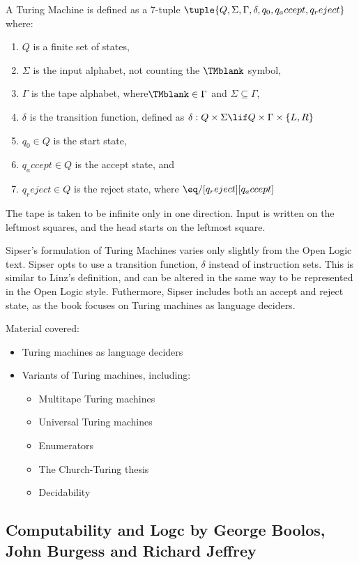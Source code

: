 \documentclass[../../include/open-logic-section]{subfiles}
\begin{document}
A Turing Machine is defined as a 7-tuple $\tuple{Q, \Sigma, \Gamma, \delta, q_0, q_accept, q_reject}$ where:
\begin{enumerate}
\item $Q$ is a finite set of states,
\item $\Sigma$ is the input alphabet, not counting the $\TMblank$ symbol,
\item $\Gamma$ is the tape alphabet, where$\TMblank \in \Gamma$ and $\Sigma \subseteq \Gamma$,
\item $\delta$ is the transition function, defined as $\delta: Q \times \Sigma \lif Q \times \Gamma \times \{L, R\}$
\item $q_0 \in Q$ is the start state,
\item $q_accept \in Q$ is the accept state, and
\item $q_reject \in Q$ is the reject state, where $\eq/[q_reject][q_accept]$
\end{enumerate}

The tape is taken to be infinite only in one direction. Input is written on the leftmost squares, and the head starts on the leftmost square. 

Sipser's formulation of Turing Machines varies only slightly from the Open Logic text. Sipser opts to use a transition function, $\delta$ instead of instruction sets. This is similar to Linz's definition, and can be altered in the same way to be represented in the Open Logic style. Futhermore, Sipser includes both an accept and reject state, as the book focuses on Turing machines as language deciders.

Material covered:
\begin{itemize}
\item Turing machines as language deciders
\item Variants of Turing machines, including:
\begin{itemize}
\item Multitape Turing machines
\item Universal Turing machines
\item Enumerators
\item The Church-Turing thesis
\item Decidability
\end{itemize}
\end{itemize}

\subsection{Computability and Logc by George Boolos, John Burgess and Richard Jeffrey}
\end{document}
